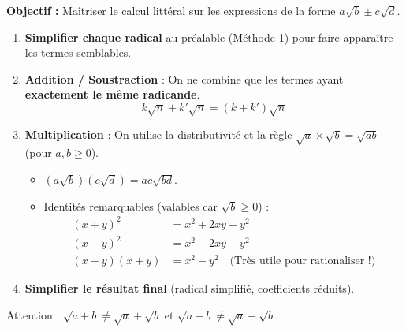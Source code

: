 \documentclass[11pt]{article}
\newcommand{\cle}[1]{{\popxbold\color{popdark}#1}}
\begin{document}
\begin{methode}
\textbf{Objectif :} Maîtriser le calcul littéral sur les expressions de la forme $a\sqrt{b} \pm c\sqrt{d}$.
\begin{enumerate}
    \item \textbf{Simplifier chaque radical} au préalable (Méthode 1) pour faire apparaître les termes semblables.
    \item \textbf{Addition / Soustraction} : On ne combine que les termes ayant \textbf{exactement le même radicande}.
    \[ k\sqrt{n} + k'\sqrt{n} = (k+k')\sqrt{n} \]
    \item \textbf{Multiplication} : On utilise la distributivité et la règle $\sqrt{a}\times\sqrt{b} = \sqrt{ab}$ (pour $a,b \ge 0$).
    \begin{itemize}
        \item $(a\sqrt{b})(c\sqrt{d}) = ac\sqrt{bd}$.
        \item Identités remarquables (valables car $\sqrt{b} \ge 0$) :
        \begin{align*}
        (x+y)^2 &= x^2 + 2xy + y^2 \\
        (x-y)^2 &= x^2 - 2xy + y^2 \\
        (x-y)(x+y) &= x^2 - y^2 \quad \text{(Très utile pour rationaliser !)}
        \end{align*}
    \end{itemize}
    \item \textbf{Simplifier le résultat final} (radical simplifié, coefficients réduits).
\end{enumerate}
\cle{Attention} : $\sqrt{a+b} \neq \sqrt{a} + \sqrt{b}$ et $\sqrt{a-b} \neq \sqrt{a} - \sqrt{b}$.
\end{methode}
\end{document}
